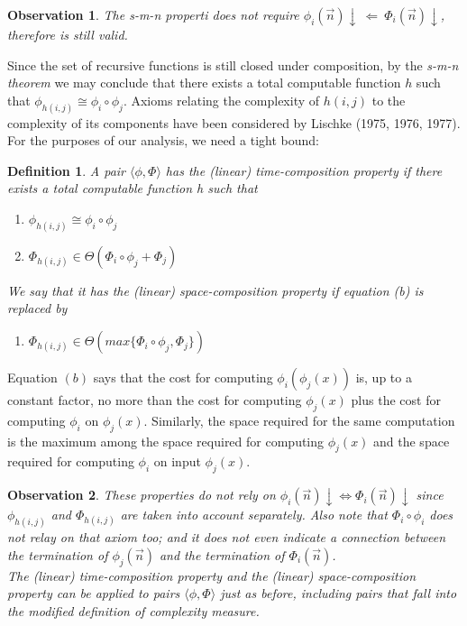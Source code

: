 \documentclass[10pt, a4paper, oneside, titlepage, draft]{article}
\newtheorem{definition}[shrd]{Definition}
\newtheorem{observation}{Observation}[shrd]
\begin{document}
\begin{observation}
    The s-m-n properti does not require $\phi_i(\vec{n})\downarrow \ \Leftarrow \ \Phi_i(\vec{n})\downarrow$, therefore is still valid.
\end{observation}

Since the set of recursive functions is still closed under composition, by the \emph{s-m-n theorem} we may conclude that there exists a total computable function $h$ such that $\phi_{h(i,j)} \cong \phi_i \circ \phi_j $. Axioms relating the complexity of $h(i,j)$ to the complexity of its components have been considered by Lischke (1975, 1976, 1977). For the purposes of our analysis, we need a tight bound:

\begin{definition}
    A pair $\langle \phi, \Phi \rangle$ has the (linear) time-composition property if there exists a total computable function h such that 
    \begin{enumerate}[label=(\alph*)]
        \item $ \phi_{h(i,j)} \cong \phi_i \circ \phi_j $
        \item $ \Phi_{h(i,j)} \in \Theta(\Phi_i \circ \phi_j + \Phi_j) $
    \end{enumerate}
    We say that it has the (linear) space-composition property if equation (b) is replaced by
    \begin{enumerate}[label=(c)]
        \item $ \Phi_{h(i,j)} \in \Theta(max \{ \Phi_i \circ \phi_j, \Phi_j \}) $
    \end{enumerate}
\end{definition}

\noindent Equation $(b)$ says that the cost for computing $\phi_i(\phi_j(x))$ is, up to a constant factor, no more than the cost for computing $\phi_j(x)$ plus the cost for computing $\phi_i$ on $\phi_j(x)$. Similarly, the space required for the same computation is the maximum among the space required for computing $\phi_j(x)$ and the space required for computing $\phi_i$ on input $\phi_j(x)$. 

\begin{observation}
    These properties do not rely on $\phi_i(\vec{n})\downarrow \iff \Phi_i(\vec{n})\downarrow$ since $\phi_{h(i,j)}$ and $\Phi_{h(i,j)}$ are taken into account separately. Also note that $\Phi_i \circ \phi_i$ does not relay on that axiom too; and it does not even indicate a connection between the termination of $\phi_j(\vec{n})$ and the termination of $\Phi_i(\vec{n})$.
    \\ The (linear) time-composition property and the (linear) space-composition property can be applied to pairs $\langle \phi, \Phi \rangle$ just as before, including pairs that fall into the modified definition of complexity measure.
\end{observation}
\end{document}
